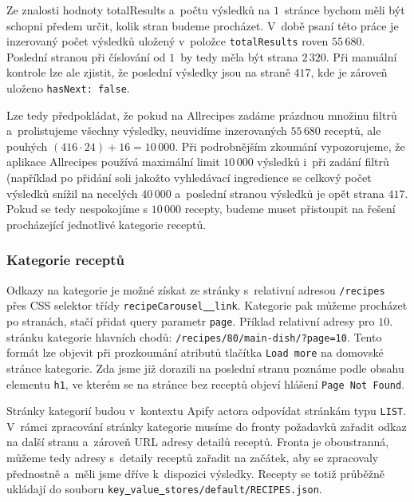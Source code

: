 Ze znalosti hodnoty {totalResults} a~počtu výsledků na $1$~stránce bychom měli být schopni předem určit, kolik stran budeme procházet. V~době psaní této práce je inzerovaný počet výsledků uložený v~položce \texttt{totalResults} roven $55\,680$. Poslední stranou při číslování od $1$~by tedy měla být strana $2\,320$. Při manuální kontrole lze ale zjistit, že poslední výsledky jsou na straně $417$, kde je zároveň uloženo \texttt{hasNext:\,false}.

Lze tedy předpokládat, že pokud na Allrecipes zadáme prázdnou množinu filtrů a~prolistujeme všechny výsledky, neuvidíme inzerovaných $55\,680$ receptů, ale pouhých $(416 \cdot 24) + 16 = 10\,000$. Při podrobnějším zkoumání vypozorujeme, že aplikace Allrecipes používá maximální limit $10\,000$ výsledků i~při zadání filtrů (například po přidání soli jakožto vyhledávací ingredience se celkový počet výsledků snížil na necelých $40\,000$ a~poslední stranou výsledků je opět strana $417$. Pokud se tedy nespokojíme s $10\,000$ recepty, budeme muset přistoupit na řešení procházející jednotlivé kategorie receptů.

\subsubsection{Kategorie receptů}

Odkazy na kategorie je možné získat ze stránky s~relativní adresou \texttt{/recipes} přes CSS selektor třídy \texttt{recipeCarousel\underline{{ }{ }}link}. Kategorie pak můžeme procházet po stranách, stačí přidat query parametr \texttt{page}. Příklad relativní adresy pro $10$. stránku kategorie hlavních chodů: \texttt{/recipes/80/main-dish/?page=10}. Tento formát lze objevit při prozkoumání atributů tlačítka \texttt{Load\,more} na domovské stránce kategorie. Zda jsme již dorazili na poslední stranu poznáme podle obsahu elementu \texttt{h1}, ve kterém se na stránce bez receptů objeví hlášení \texttt{Page\,Not\,Found}.

Stránky kategorií budou v~kontextu Apify actora odpovídat stránkám typu \texttt{LIST}. V~rámci zpracování stránky kategorie musíme do fronty požadavků zařadit odkaz na další stranu a~zároveň URL adresy detailů receptů. Fronta je oboustranná, můžeme tedy adresy s~detaily receptů zařadit na začátek, aby se zpracovaly přednostně a~měli jsme dříve k~dispozici výsledky. Recepty se totiž průběžně ukládají do souboru \texttt{key\underline{{ }}value\underline{{ }}stores/default/RECIPES.json}.

